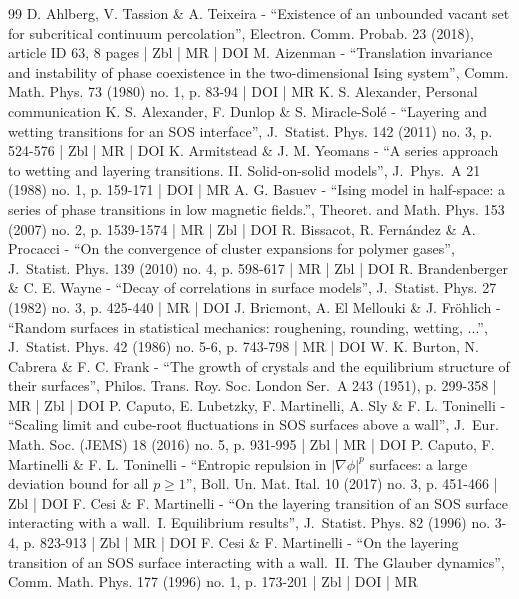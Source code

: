 \documentclass[10pt]{amsart}
\numberwithin{equation}{section}
\theoremstyle{plain}
\theoremstyle{definition}
\begin{document}
\begin{thebibliography}{99}
D. Ahlberg, V. Tassion \& A. Teixeira - “Existence of an unbounded vacant set for subcritical continuum percolation”, Electron. Comm. Probab. 23 (2018), article ID 63, 8 pages | Zbl | MR | DOI
M. Aizenman - “Translation invariance and instability of phase coexistence in the two-dimensional Ising system”, Comm. Math. Phys. 73 (1980) no. 1, p. 83-94 | DOI | MR
K. S. Alexander, Personal communication
K. S. Alexander, F. Dunlop \& S. Miracle-Solé - “Layering and wetting transitions for an SOS interface”, J. Statist. Phys. 142 (2011) no. 3, p. 524-576 | Zbl | MR | DOI
K. Armitstead \& J. M. Yeomans - “A series approach to wetting and layering transitions. II. Solid-on-solid models”, J. Phys. A 21 (1988) no. 1, p. 159-171 | DOI | MR
A. G. Basuev - “Ising model in half-space: a series of phase transitions in low magnetic fields.”, Theoret. and Math. Phys. 153 (2007) no. 2, p. 1539-1574 | MR | Zbl | DOI
R. Bissacot, R. Fernández \& A. Procacci - “On the convergence of cluster expansions for polymer gases”, J. Statist. Phys. 139 (2010) no. 4, p. 598-617 | MR | Zbl | DOI
R. Brandenberger \& C. E. Wayne - “Decay of correlations in surface models”, J. Statist. Phys. 27 (1982) no. 3, p. 425-440 | MR | DOI
J. Bricmont, A. El Mellouki \& J. Fröhlich - “Random surfaces in statistical mechanics: roughening, rounding, wetting, ...”, J. Statist. Phys. 42 (1986) no. 5-6, p. 743-798 | MR | DOI
W. K. Burton, N. Cabrera \& F. C. Frank - “The growth of crystals and the equilibrium structure of their surfaces”, Philos. Trans. Roy. Soc. London Ser. A 243 (1951), p. 299-358 | MR | Zbl | DOI
P. Caputo, E. Lubetzky, F. Martinelli, A. Sly \& F. L. Toninelli - “Scaling limit and cube-root fluctuations in SOS surfaces above a wall”, J. Eur. Math. Soc. (JEMS) 18 (2016) no. 5, p. 931-995 | Zbl | MR | DOI
P. Caputo, F. Martinelli \& F. L. Toninelli - “Entropic repulsion in $|\nabla \phi |^p$ surfaces: a large deviation bound for all $p\ge 1$”, Boll. Un. Mat. Ital. 10 (2017) no. 3, p. 451-466 | Zbl | DOI
F. Cesi \& F. Martinelli - “On the layering transition of an SOS surface interacting with a wall. I. Equilibrium results”, J. Statist. Phys. 82 (1996) no. 3-4, p. 823-913 | Zbl | MR | DOI
F. Cesi \& F. Martinelli - “On the layering transition of an SOS surface interacting with a wall. II. The Glauber dynamics”, Comm. Math. Phys. 177 (1996) no. 1, p. 173-201 | Zbl | DOI | MR

\end{thebibliography}
\end{document}

